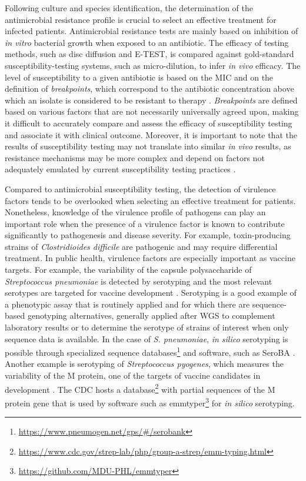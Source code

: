 Following culture and species identification, the determination of the antimicrobial resistance profile is crucial to select an effective treatment for infected patients. Antimicrobial resistance tests are mainly based on inhibition of \textit{in vitro} bacterial growth when exposed to an antibiotic. The efficacy of testing methods, such as disc diffusion and E-TEST, is compared against gold-standard susceptibility-testing systems, such as micro-dilution, to infer \textit{in vivo} efficacy.
The level of susceptibility to a given antibiotic is based on the \ac{MIC} and on the definition of \textit{breakpoints}, which correspond to the antibiotic concentration above which an isolate is considered to be resistant to therapy \cite{didelot_transforming_2012}. \textit{Breakpoints} are defined based on various factors that are not necessarily universally agreed upon, making it difficult to accurately compare and assess the efficacy of susceptibility testing and associate it with clinical outcome. Moreover, it is important to note that the results of susceptibility testing may not translate into similar \textit{in vivo} results, as resistance mechanisms may be more complex and depend on factors not adequately emulated by current susceptibility testing practices \cite{didelot_transforming_2012, hassall_limitations_2024}.

Compared to antimicrobial susceptibility testing, the detection of virulence factors tends to be overlooked when selecting an effective treatment for patients. Nonetheless, knowledge of the virulence profile of pathogens can play an important role when the presence of a virulence factor is known to contribute significantly to pathogenesis and disease severity. For example, toxin-producing strains of \textit{Clostridioides difficile} are pathogenic and may require differential treatment. In public health, virulence factors are especially important as vaccine targets. For example, the variability of the capsule polysaccharide of \textit{Streptococcus pneumoniae} is detected by serotyping and the most relevant serotypes are targeted for vaccine development \cite{henrichsen_six_1995, tarrago_identification_2008, silva-costa_adult_2023, musher_remarkable_2022}. Serotyping is a good example of a phenotypic assay that is routinely applied and for which there are sequence-based genotyping alternatives, generally applied after \ac{WGS} to complement laboratory results or to determine the serotype of strains of interest when only sequence data is available. In the case of \textit{S. pneumoniae}, \textit{in silico} serotyping is possible through specialized sequence databases\footnote{\url{https://www.pneumogen.net/gps/\#/serobank}} and software, such as SeroBA \cite{epping_seroba_2018, lorenz_serobav20_2025}. Another example is serotyping of \textit{Streptococcus pyogenes}, which measures the variability of the M protein, one of the targets of vaccine candidates in development \cite{walkinshaw_streptococcus_2023}. The \ac{CDC} hosts a database\footnote{\url{https://www.cdc.gov/strep-lab/php/group-a-strep/emm-typing.html}} with partial sequences of the M protein gene that is used by software such as emmtyper\footnote{\url{https://github.com/MDU-PHL/emmtyper}} for \textit{in silico} serotyping.

